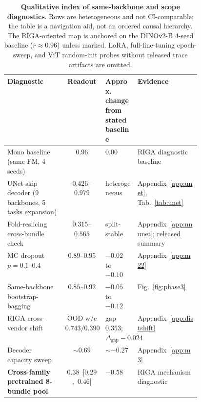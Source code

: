 \begin{table}[!htbp]
  \caption{\textbf{Qualitative index of same-backbone and scope diagnostics}. Rows are heterogeneous and not CI-comparable; the table is a navigation aid, not an ordered causal hierarchy. The RIGA-oriented map is anchored on the DINOv2-B 4-seed baseline ($\bar{r}{\approx}0.96$) unless marked. LoRA, full-fine-tuning epoch-sweep, and ViT random-init probes without released trace artifacts are omitted.}
  \label{tab:lever}
  \centering\scriptsize
  \setlength{\tabcolsep}{2.5pt}
  \begin{tabularx}{\linewidth}{p{0.30\linewidth}c p{0.16\linewidth}Y}
    \toprule
    Diagnostic & Readout & Approx. change from stated baseline & Evidence \\
    \midrule
    Mono baseline (same FM, 4 seeds)                       & $0.96$                           & $0.00$                       & RIGA diagnostic baseline \\
    UNet-skip decoder (9 backbones, 5 tasks expansion)     & $0.426$--$0.979$                 & heterogeneous                & Appendix~\ref{app:unet}, Tab.~\ref{tab:unet} \\
    Fold-reslicing cross-bundle check                      & $0.315$--$0.565$                 & split-stable                 & Appendix~\ref{app:nnunet}; released summary \\
    MC dropout $p{=}0.1$--$0.4$                            & $0.89$--$0.95$                   & $-0.02$ to $-0.10$           & Appendix~\ref{app:m22} \\
    Same-backbone bootstrap-bagging                        & $0.85$--$0.92$                   & $-0.05$ to $-0.12$           & Fig.~\ref{fig:phase3} \\
    RIGA cross-vendor shift                                & OOD w/c $0.743/0.390$             & gap $0.353$; $\Delta_{\mathrm{gap}}{-}0.024$ & Appendix~\ref{app:distshift} \\
    Decoder capacity sweep                                 & $\sim 0.69$                      & $\sim -0.27$                 & Appendix~\ref{app:m3} \\
    \midrule
    \textbf{Cross-family pretrained 8-bundle pool}         & $\mathbf{0.38}$~[$0.29$,~$0.46$] & $\mathbf{-0.58}$             & RIGA mechanism diagnostic \\
    \bottomrule
  \end{tabularx}
\end{table}



